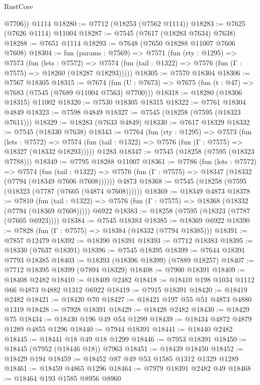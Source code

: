 \begin{lexlean}{RustCore}
\begin{coremodule}
        @7706))
    @1114
@18280 := @7712 (@18253 (@7562 @1114))
@18283 := @7625 (@7626 @1114) @11004
@18287 := @7545 (@7617 (@18283 @7634) @7638)
@18288 := @7651 @1114
@18293 := @7648 (@7650 @18288 @11007 @7606 @7608)
@18304 := fun (params : @7569) =>
  @7571
    (fun (rty : @1295) =>
    @7573
      (fun (lets : @7572) =>
      @7574 (fun (tail : @1322) => @7576 (fun (Γ : @7575) => @18260 (@18287 @18293)))))
@18305 := @7570 @18304
@18306 := @7567 @18305
@18315 := @7674
    (fun (U : @7673) => @7675 (fun (t : @47) => @7683 (@7545 (@7689 @11004 @7563) @7700)))
@18318 := @18280 (@18306 @18315) @11002
@18320 := @7530 @18305 @18315
@18322 := @7761 @18304 @4849
@18323 := @7598 @4849
@18327 := @7545 (@18258 (@7595 (@18323 @7611)))
@18329 := @18283 (@7633 @4849)
@18330 := @7617 @18329
@18332 := @7545 (@18330 @7638)
@18343 := @7764
    (fun (rty : @1295) =>
    @7573
      (fun (lets : @7572) =>
      @7574 (fun (tail : @1322) => @7576 (fun (Γ : @7575) => @18327 (@18332 @18293)))))
    @1283
@18347 := @7545 (@18258 (@7595 (@18323 @7788)))
@18349 := @7795 @18288 @11007
@18361 := @7786
    (fun (lets : @7572) =>
    @7574
      (fun (tail : @1322) =>
      @7576 (fun (Γ : @7575) => @18347 (@18332 (@7794 (@18349 @7606 @7608))))))
    @4873
@18368 := @7545 (@18258 (@7595 (@18323 (@7787 (@7605 (@4874 @7608))))))
@18369 := @18349 @4873
@18378 := @7810
    (fun (tail : @1322) => @7576 (fun (Γ : @7575) => @18368 (@18332 (@7794 (@18369 @7608)))))
    @6922
@18383 := @18258 (@7595 (@18323 (@7787 (@7605 @6923))))
@18384 := @7545 @18383
@18385 := @18369 @6922
@18390 := @7828 (fun (Γ : @7575) => @18384 (@18332 (@7794 @18385)))
@18391 := @7857 @12479
@18392 := @18390 @18391
@18393 := @7712 @18383
@18395 := @18330 (@7637 @18391)
@18396 := @7545 @18395
@18399 := @7644 @18391 @7793 @18385
@18403 := @18393 (@18396 @18399) (@7889 @18257)
@18407 := @7712 @18395 @18399 (@7894 @18329)
@18408 := @7900 @18391
@18409 := @18408 @2482
@18410 := @18409 @2482
@18418 := @18410 @198 @1034 @1112 @66 @4873 @4882 @1312 @6922
@18419 := @7915 @18391
@18420 := @18419 @2482
@18421 := @18420 @70
@18427 := @18421 @197 @55 @51 @4873 @4880 @1319
@18428 := @7928 @18391
@18429 := @18428 @2482
@18430 := @18429 @75
@18434 := @18430 @196 @49 @54 @1299
@18439 := @18434 @4872 @4879 @1289 @4855 @1296
@18440 := @7944 @18391
@18441 := @18440 @2482
@18445 := @18441 @18 @49 @18 @1299
@18446 := @7953 @18391
@18450 := @18445 (@7952 (@18446 @18)) @7963
@18451 := @18439 @18450
@18452 := @18429 @194
@18459 := @18452 @87 @49 @53 @1585 @1312 @1329 @1289
@18461 := @18459 @4865 @1296
@18464 := @7979 @18391 @2482 @49
@18468 := @18464 @193 @1585 @8956 @8960

\end{coremodule}
\end{lexlean}
